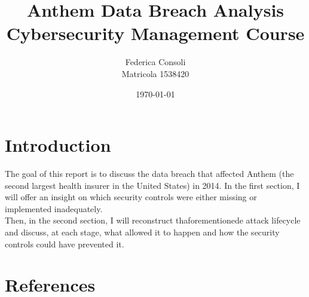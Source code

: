 \documentclass[11pt]{extarticle}
\title{%
	\LARGE \bfseries Anthem Data Breach Analysis\\
	\large Cybersecurity Management Course}
\author{Federica Consoli\\Matricola 1538420}
\date{\today}
\begin{document}
	\maketitle

	\section{Introduction}
	The goal of this report is to discuss the data breach that affected Anthem (the second largest health insurer in the United States) in 2014. In the first section, I will offer an insight on which security controls were either missing or implemented inadequately.\\ Then, in the second section, I will reconstruct thaforementionede attack lifecycle and discuss, at each stage, what allowed it to happen and how the  security controls could have prevented it. 
	
	
	
	
	
	
	 
	\newpage
	\section{References}
	\printbibliography[heading=none]
\end{document}
